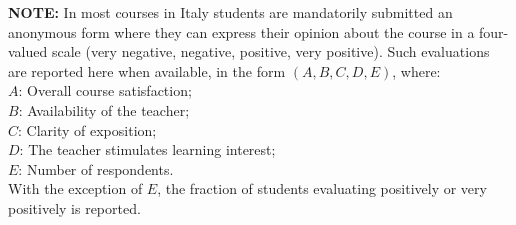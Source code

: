 
{
\scriptsize{
\textbf{NOTE:} In most courses in Italy students are mandatorily submitted an anonymous form where they can express their opinion about the course in a four-valued scale (very negative, negative, positive, very positive). Such evaluations are reported here when available, in the form $(A, B, C, D, E)$, where:
\\$A$: Overall course satisfaction;
\\$B$: Availability of the teacher;
\\$C$: Clarity of exposition;
\\$D$: The teacher stimulates learning interest;
\\$E$: Number of respondents.
\\With the exception of $E$, the fraction of students evaluating positively or very positively is reported.
}
}

\newcommand{\shortcourse}[6]{
    \href{#1}{\textit{\textbf{#2}}},
    \href{#3}{#4},
    \href{#5}{#6}}

\newcommand{\course}[9]{
    \shortcourse{#1}{#2}{#3}{#4}{#5}{#6},
    #7,
    #8.
    \textit{#9}
}

\newcommand{\shortunibocourse}[4]{
    \shortcourse{#1}{#2}
    {http://www.unibo.it}{Alma Mater Studiorum---Università di Bologna}
    {#3}{#4}}

\newcommand{\unibocourse}[7]{
    \course{#1}{#2}
    {http://www.unibo.it}{Alma Mater Studiorum---Università di Bologna}
    {#3}{#4}
    {#5}
    {#6}{#7}
}

